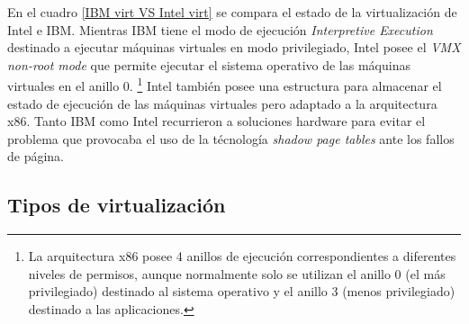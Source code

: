 \documentclass[spanisheDIVcalc,twoside,parskip-,pointlessnumbers,final]{scrbook}
\begin{document}
En el cuadro \ref{IBM virt VS Intel virt} se compara el estado de
la virtualización de Intel e IBM. Mientras IBM tiene el modo de ejecución
\emph{Interpretive Execution} destinado a ejecutar máquinas virtuales
en modo privilegiado, Intel posee el \emph{VMX non-root mode} que
permite ejecutar el sistema operativo de las máquinas virtuales en
el anillo 0.%
\footnote{La arquitectura x86 posee 4 anillos de ejecución correspondientes
a diferentes niveles de permisos, aunque normalmente solo se utilizan
el anillo 0 (el más privilegiado) destinado al sistema operativo y
el anillo 3 (menos privilegiado) destinado a las aplicaciones.%
} Intel también posee una estructura para almacenar el estado de ejecución
de las máquinas virtuales pero adaptado a la arquitectura x86. Tanto
IBM como Intel recurrieron a soluciones hardware para evitar el problema
que provocaba el uso de la técnología \emph{shadow page tables }ante
los fallos de página.


\subsection{Tipos de virtualización}
\end{document}
